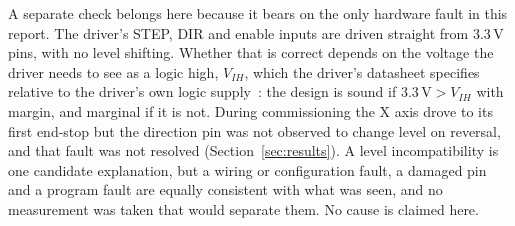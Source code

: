 A separate check belongs here because it bears on the only hardware fault in this report.
The driver's STEP, DIR and enable inputs are driven straight from 3.3\,V pins, with no level shifting.
Whether that is correct depends on the voltage the driver needs to see as a logic high, $V_{IH}$, which the driver's datasheet specifies relative to the driver's own logic supply~\cite{a4988ds}: the design is sound if $3.3\,\mathrm{V}>V_{IH}$ with margin, and marginal if it is not.
During commissioning the X axis drove to its first end-stop but the direction pin was not observed to change level on reversal, and that fault was not resolved (Section~\ref{sec:results}).
A level incompatibility is one candidate explanation, but a wiring or configuration fault, a damaged pin and a program fault are equally consistent with what was seen, and no measurement was taken that would separate them.
No cause is claimed here.


